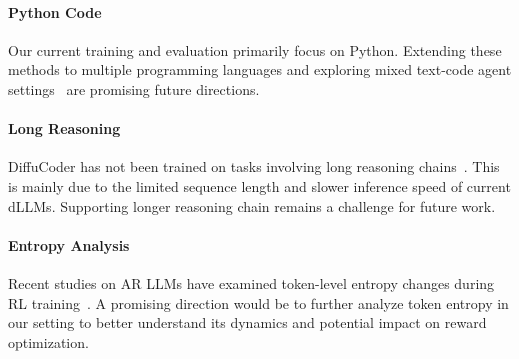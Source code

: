 \paragraph{Python Code}
Our current training and evaluation primarily focus on Python. Extending these methods to multiple programming languages and exploring mixed text-code agent settings~\citep{xu2024lemur} are promising future directions.

\paragraph{Long Reasoning}
DiffuCoder has not been trained on tasks involving long reasoning chains~\citep{Polaris2025,liu2025acereason}. This is mainly due to the limited sequence length and slower inference speed of current dLLMs. Supporting longer reasoning chain remains a challenge for future work.

\paragraph{Entropy Analysis}
Recent studies on AR LLMs have examined token-level entropy changes during RL training~\citep{cui2025entropy,liu2025prorl,agarwal2025unreasonable}. A promising direction would be to further analyze token entropy in our setting to better understand its dynamics and potential impact on reward optimization.
